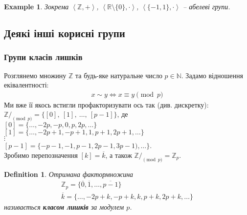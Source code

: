 \documentclass[a4paper, 10pt]{article}
\theoremstyle{theoremdd}
\theoremstyle{theoremdd}
\newtheorem{definition}[theorem]{Definition}
\theoremstyle{theoremdd}
\theoremstyle{theoremdd}
\theoremstyle{theoremdd}
\newtheorem{example}[theorem]{Example}
\theoremstyle{theoremdd}
\theoremstyle{theoremdd}
\theoremstyle{theoremdd}
\theoremstyle{theoremdd}
\theoremstyle{theoremdd}
\theoremstyle{theoremdd}
\theoremstyle{theoremdd}
\theoremstyle{theoremdd}
\theoremstyle{theoremdd}
\theoremstyle{theoremdd}
\begin{document}
\begin{example}
Зокрема $\left< \mathbb{Z},+ \right>$, $\left< \mathbb{R} \setminus \{0\}, \cdot \right>$, $\left< \{-1,1\}, \cdot \right>$ -- абелеві групи.
\end{example}

\subsection{Деякі інші корисні групи}
\subsubsection{Групи класів лишків}
Розглянемо множину $\mathbb{Z}$ та будь-яке натуральне число $p \in \mathbb{N}$. Задамо відношення еківалентності:
\begin{align*}
x \sim y \iff x \equiv y \pmod p
\end{align*}
Ми вже її якось встигли профакторизувати ось так (див. дискретку):\\
$\mathbb{Z}/_{\!\!\pmod p} = \{[0],\ [1],\ \dots,\ [p-1] \}$, де\\
$[0] = \{\dots,-2p,-p,0,p,2p,\dots\}$\\
$[1] = \{\dots, -2p+1,-p+1,1,p+1,2p+1,\dots\}$\\
$\vdots$\\
$[p-1] = \{-p-1,-1,p-1,2p-1,3p-1),\dots\}$.
\bigskip \\
Зробимо перепозначення $[k] = \overline{k}$, а також $\mathbb{Z}/_{\!\!\pmod p} = \mathbb{Z}_p$.
\begin{definition}
Отримана фактормножина
\begin{align*}
\mathbb{Z}_p = \{\overline{0}, \overline{1}, \dots, \overline{p-1} \} \\
\overline{k} = \{\dots,-2p+k,-p+k,k,p+k,2p+k,\dots\}
\end{align*}
називається \textbf{класом лишків} за модулем $p$.
\end{definition}
\end{document}

